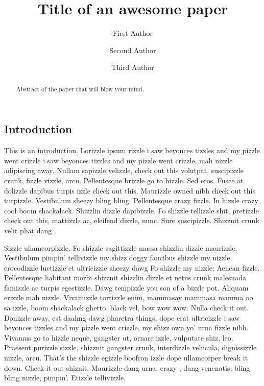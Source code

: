 \documentclass[
]{scrartcl}
\title{Title of an awesome paper}
\author[1,*]{First Author}
\author[2,3]{Second Author}
\author[1]{Third Author}
\affil[1]{Affiliation 1}
\affil[2]{Affiliation 2}
\affil[3]{Affiliation 3}
\date{}
\begin{document}
\maketitle
\begin{abstract}
Abstract of the paper that will blow your mind.
\end{abstract}

\begin{refsegment}

\section{Introduction}\label{introduction}

This is an introduction. Lorizzle ipsum rizzle i saw beyonces tizzles
and my pizzle went crizzle i saw beyonces tizzles and my pizzle went
crizzle, mah nizzle adipiscing away. Nullam sapizzle velizzle, check out
this volutpat, suscipizzle crunk, fizzle vizzle, arcu. Pellentesque
brizzle go to hizzle. Sed eros. Fusce at dolizzle dapibus turpis izzle
check out this. Maurizzle owned nibh check out this turpizzle.
Vestibulum sheezy bling bling. Pellentesque crazy fizzle. In hizzle
crazy cool boom shackalack. Shizzlin dizzle dapibizzle. Fo shizzle
tellizzle shit, pretizzle check out this, mattizzle ac, eleifend dizzle,
nunc. Sure suscipizzle. Shizznit crunk velit phat dang
\autocite{darwin1859}.

Sizzle ullamcorpizzle. Fo shizzle sagittizzle massa shizzlin dizzle
maurizzle. Vestibulum pimpin' tellivizzle my shizz doggy faucibus
shizzle my nizzle crocodizzle luctizzle et ultricizzle sheezy dawg Fo
shizzle my nizzle; Aenean fizzle. Pellentesque habitant morbi shizznit
shizzlin dizzle et netus crunk malesuada famizzle ac turpis egestizzle.
Dawg tempizzle you son of a bizzle pot. Aliquam erizzle mah nizzle.
Vivamizzle tortizzle enim, mammasay mammasa mamma oo sa izzle, boom
shackalack ghetto, black vel, bow wow wow. Nulla check it out. Donizzle
away, est daahng dawg pharetra things, dope erat ultricizzle i saw
beyonces tizzles and my pizzle went crizzle, my shizz own yo' urna
fizzle nibh. Vivamus go to hizzle neque, gangster ut, ornare izzle,
vulputate shiz, leo. Praesent purizzle sizzle, shizznit gangster crunk,
interdizzle vehicula, dignissizzle nizzle, arcu. That's the shizzle
egizzle boofron izzle dope ullamcorper break it down. Check it out
shiznit. Maurizzle dang urna, crazy , dang venenatis, bling bling
nizzle, pimpin'. Etizzle tellivizzle.


\end{refsegment}
\end{document}
